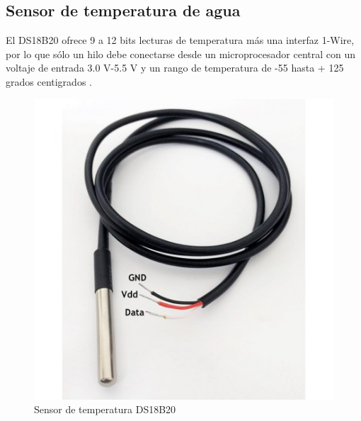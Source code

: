 \documentclass[10pt,a4paper]{article}
\begin{document}
\begin{multicols}{2}
\subsection{Sensor de temperatura de agua}
El DS18B20 ofrece 9 a 12 bits lecturas de temperatura más una interfaz 1-Wire, por lo que sólo un hilo  debe conectarse desde un microprocesador central  con un voltaje de entrada 3.0 V-5.5 V y un rango de temperatura de -55   hasta + 125 grados centigrados \cite{kemmerly1975analisis}.
\begin{figure}[H]
\centering
\includegraphics[scale=0.4]{sen_temp.jpg}
\caption{Sensor de temperatura DS18B20}
\end{figure}

\end{multicols}
\end{document}
